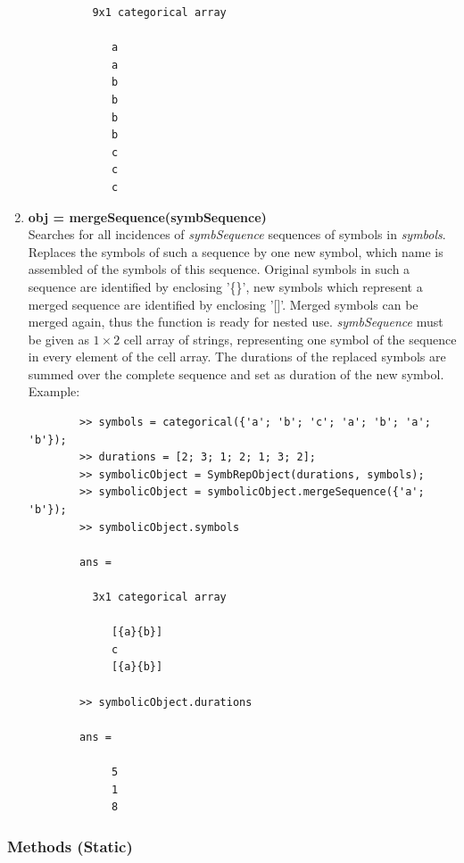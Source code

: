 \documentclass[a4]{scrreprt}
\begin{document}
\begin{enumerate}
\begin{verbatim}
		  9x1 categorical array
		
		     a 
		     a 
		     b 
		     b 
		     b 
		     b 
		     c 
		     c 
		     c 
		\end{verbatim}
		
		
	\item \textbf{obj = mergeSequence(symbSequence)}\\
		Searches for all incidences of \textit{symbSequence} sequences of symbols in \textit{symbols}. Replaces the symbols of such a sequence by one new symbol, which name is assembled of the symbols of this sequence. Original symbols in such a sequence are identified by enclosing '\{\}', new symbols which represent a merged sequence are identified by enclosing '[]'. Merged symbols can be merged again, thus the function is ready for nested use. \textit{symbSequence} must be given as $1 \times 2$ cell array of strings, representing one symbol of the sequence in every element of the cell array. The durations of the replaced symbols are summed over the complete sequence and set as duration of the new symbol.
		Example:
		\begin{verbatim}
		>> symbols = categorical({'a'; 'b'; 'c'; 'a'; 'b'; 'a'; 'b'});
		>> durations = [2; 3; 1; 2; 1; 3; 2];
		>> symbolicObject = SymbRepObject(durations, symbols);
		>> symbolicObject = symbolicObject.mergeSequence({'a'; 'b'});
		>> symbolicObject.symbols
		
		ans = 
		
		  3x1 categorical array
		
		     [{a}{b}] 
		     c 
		     [{a}{b}] 
		
		>> symbolicObject.durations
		
		ans =
		
		     5
		     1
		     8	
		\end{verbatim}
	
	
	
\end{enumerate}

\subsubsection{Methods (Static)}
\end{document}
